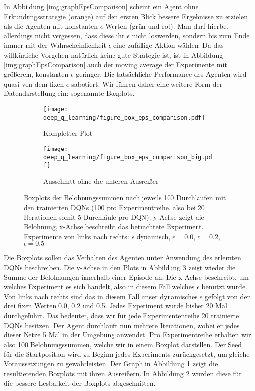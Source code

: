 In Abbildung \ref{img:graphEpsComparison} scheint ein Agent ohne Erkundungsstrategie (orange) auf den ersten Blick bessere Ergebnisse zu erzielen als die Agenten mit konstanten $ \epsilon $-Werten (grün und rot). Man darf hierbei allerdings nicht vergessen, dass diese ihr $ \epsilon $ nicht \glqq loswerden\grqq{}, sondern bis zum Ende immer mit der Wahrscheinlichkeit $ \epsilon $ eine zufällige Aktion wählen. Da das willkürliche Vorgehen natürlich keine gute Strategie ist, ist in Abbildung \ref{img:graphEpsComparison} auch der moving average der Experimente mit größerem, konstanten $ \epsilon $ geringer. Die tatsächliche Performance des Agenten wird quasi von dem fixen $ \epsilon $ sabotiert. Wir führen daher eine weitere Form der Datendarstellung ein: sogenannte Boxplots.
\begin{figure}[h!]
    \centering
    \begin{subfigure}[b]{0.7\textwidth}
        \texttt{[image: deep\_q\_learning/figure\_box\_eps\_comparison.pdf]}
        \caption{Kompletter Plot}
        \label{img:graphBoxEpsComparison}
    \end{subfigure}
    \begin{subfigure}[b]{0.7\textwidth}
        \texttt{[image: deep\_q\_learning/figure\_box\_eps\_comparison\_big.pdf]}
        \caption{Ausschnitt ohne die unteren Ausreißer}
        \label{img:graphBoxEpsComparisonBig}
    \end{subfigure}
    \caption{Boxplots der Belohnungssummen nach jeweils 100 Durchläufen mit den trainierten DQNs (100 pro Experimentreihe, also bei 20 Iterationen somit 5 Durchläufe pro DQN). y-Achse zeigt die Belohnung, x-Achse beschreibt das betrachtete Experiment. Experimente von links nach rechts: $ \epsilon $ dynamisch, $ \epsilon = 0.0 $, $ \epsilon = 0.2 $, $ \epsilon = 0.5 $}
    \label{img:graphBoxEpsComparisonBoth}
\end{figure}

Die Boxplots sollen das Verhalten des Agenten unter Anwendung des erlernten DQNs beschreiben. Die y-Achse in den Plots in Abbildung \ref{img:graphBoxEpsComparisonBoth} zeigt wieder die Summe der Belohnungen innerhalb einer Episode an. Die x-Achse beschreibt, um welches Experiment es sich handelt, also in diesem Fall welches $ \epsilon $ benutzt wurde. Von links nach rechts sind das in diesem Fall unser dynamisches $ \epsilon $ gefolgt von den drei fixen Werten 0.0, 0.2 und 0.5. Jedes Experiment wurde bisher 20 Mal durchgeführt. Das bedeutet, dass wir für jede Experimentenreihe 20 trainierte DQNs besitzen. Der Agent durchläuft nun mehrere Iterationen, wobei er jedes dieser Netze 5 Mal in der Umgebung anwendet. Pro Experimentreihe erhalten wir also 100 Belohnungssummen, welche wir in einem Boxplot darstellen. Der Seed für die Startposition wird zu Beginn jedes Experiments zurückgesetzt, um gleiche Voraussetzungen zu gewährleisten. Der Graph in Abbildung \ref{img:graphBoxEpsComparison} zeigt die resultierenden Boxplots mit ihren Ausreißern. In Abbildung \ref{img:graphBoxEpsComparisonBig} wurden diese für die bessere Lesbarkeit der Boxplots abgeschnitten.

